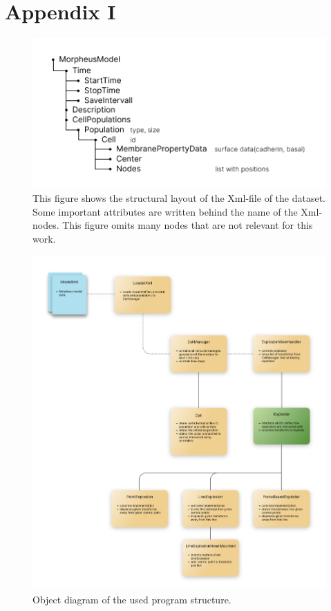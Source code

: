 \chapter{Appendix I}
\label{sec:appendix}

\begin{figure}[h]
	\centering
	\includegraphics[width=1\linewidth]{fig/Images/DataLayout}
	\caption[]{This figure shows the structural layout of the Xml-file of the dataset. Some important attributes are written behind the name of the Xml-nodes. This figure omits many nodes that are not relevant for this work. }
	\label{fig:DataLayout}
\end{figure}

\begin{figure}[h]
	\centering
	\includegraphics[width=1\linewidth]{fig/Images/objectDiagram}
	\caption[]{Object diagram of the used program structure. }
	\label{fig:objectDiagram}
\end{figure}

